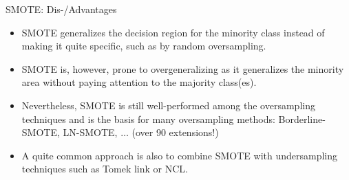 \documentclass[11pt,compress,t,notes=noshow, xcolor=table]{beamer}
\begin{document}
	\begin{frame}{SMOTE: Dis-/Advantages}

		\small

		\begin{itemize}
		
			\item SMOTE generalizes the decision region for the minority class instead of making it quite specific, such as by random oversampling. 
            \vspace{10pt}
		
			\item SMOTE is, however, prone to overgeneralizing as it generalizes the minority area without paying attention to the majority class(es).
            \vspace{10pt}

		
			\item Nevertheless, SMOTE is still well-performed among the oversampling techniques and is the basis for many oversampling methods: Borderline-SMOTE, LN-SMOTE, $\ldots$ (over 90 extensions!)
            \vspace{10pt}

			\item A quite common approach is also to combine SMOTE with undersampling techniques such as Tomek link or NCL.

		\end{itemize}		

	\end{frame}
\end{document}
